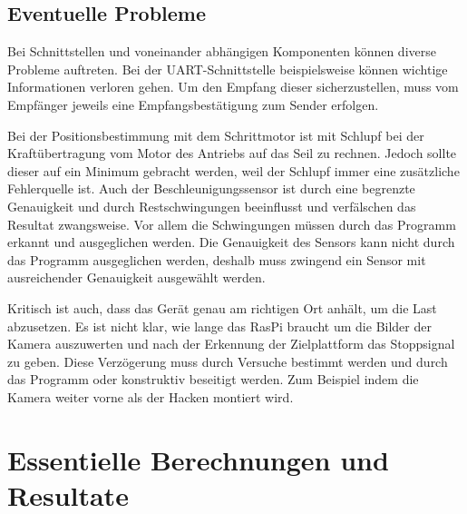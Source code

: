 \documentclass[a4paper]{report}
\begin{document}
\subsection{Eventuelle Probleme}
\label{ssec:EvtlProb}
Bei Schnittstellen und voneinander abhängigen Komponenten können diverse Probleme auftreten. Bei der UART-Schnittstelle beispielsweise können wichtige Informationen verloren gehen. Um den Empfang dieser sicherzustellen, muss vom Empfänger jeweils eine Empfangsbestätigung zum Sender erfolgen.

Bei der Positionsbestimmung mit dem Schrittmotor ist mit Schlupf bei der Kraftübertragung vom Motor des Antriebs auf das Seil zu rechnen. Jedoch sollte dieser auf ein Minimum gebracht werden, weil der Schlupf immer eine zusätzliche Fehlerquelle ist. Auch der Beschleunigungssensor ist durch eine begrenzte Genauigkeit und durch Restschwingungen beeinflusst und verfälschen das Resultat zwangsweise. Vor allem die Schwingungen müssen durch das Programm erkannt und ausgeglichen werden. Die Genauigkeit des Sensors kann nicht durch das Programm ausgeglichen werden, deshalb muss zwingend ein Sensor mit ausreichender Genauigkeit ausgewählt werden.

Kritisch ist auch, dass das Gerät genau am richtigen Ort anhält, um die Last abzusetzen. Es ist nicht klar, wie lange das RasPi braucht um die Bilder der Kamera auszuwerten und nach der Erkennung der Zielplattform das Stoppsignal zu geben. Diese Verzögerung muss durch Versuche bestimmt werden und durch das Programm oder konstruktiv beseitigt werden. Zum Beispiel indem die Kamera weiter vorne als der Hacken montiert wird.

\section{Essentielle Berechnungen und Resultate}
\label{sec:EssBerechnung}
\end{document}
